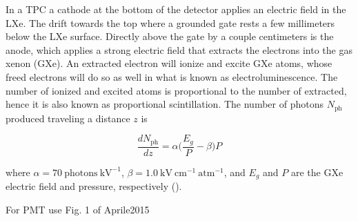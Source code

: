 In a TPC a cathode at the bottom of the detector applies an electric field in the LXe.  The \electron drift towards the top where a
grounded gate rests a few millimeters below the LXe surface.  Directly above the gate by a couple centimeters is the anode, which
applies a strong electric field that extracts the electrons into the gas xenon (GXe).  An extracted electron will ionize and excite
GXe atoms, whose freed electrons will do so as well in what is known as electroluminescence.  The number of ionized and excited atoms
is proportional to the number of \electron extracted, hence it is also known as proportional scintillation.  The number of photons
$N_{\mathrm{ph}}$ produced traveling a distance $z$ is

\begin{equation}
\frac{dN_{\mathrm{ph}}}{dz} = \alpha \Big( \frac{E_{g}}{P} - \beta \Big) P
\label{eq:electronlum}
\end{equation}

\noindent where $\alpha = 70\ \mathrm{photons\ kV^{-1}}$, $\beta = 1.0\ \mathrm{kV\ cm^{-1}\ atm^{-1}}$, and $E_{g}$ and $P$ are the
GXe electric field and pressure, respectively ().

For PMT use Fig. 1 of Aprile2015